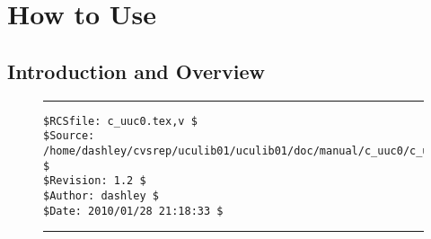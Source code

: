 
\chapter{How to Use \productbasenameshort{}}

\label{cuuc0}


\section{Introduction and Overview}
\label{cuuc0:siov0}


\noindent\begin{figure}[!b]
\noindent\rule[-0.25in]{\textwidth}{1pt}
\begin{tiny}
\begin{verbatim}
$RCSfile: c_uuc0.tex,v $
$Source: /home/dashley/cvsrep/uculib01/uculib01/doc/manual/c_uuc0/c_uuc0.tex,v $
$Revision: 1.2 $
$Author: dashley $
$Date: 2010/01/28 21:18:33 $
\end{verbatim}
\end{tiny}
\noindent\rule[0.25in]{\textwidth}{1pt}
\end{figure}

%
%

